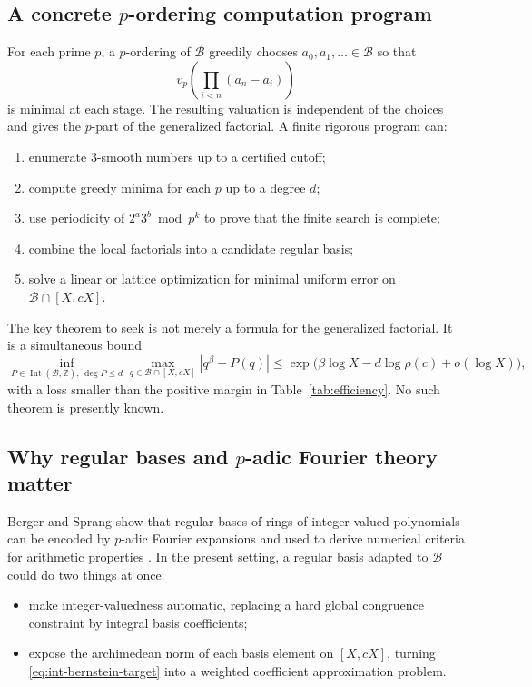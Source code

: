 \documentclass[11pt,oneside]{article}
\theoremstyle{definition}
\theoremstyle{remark}
\newcommand{\Z}{\mathbb Z}
\newcommand{\Bsem}{\mathcal B}
\newcommand{\Int}{\operatorname{Int}}
\begin{document}
\subsection{A concrete $p$-ordering computation program}

For each prime $p$, a $p$-ordering of $\Bsem$ greedily chooses
$a_0,a_1,\ldots\in\Bsem$ so that
\[
 v_p\!\left(\prod_{i<n}(a_n-a_i)\right)
\]
is minimal at each stage.  The resulting valuation is independent of the choices and gives
the $p$-part of the generalized factorial.  A finite rigorous program can:

\begin{enumerate}
\item enumerate $3$-smooth numbers up to a certified cutoff;
\item compute greedy minima for each $p$ up to a degree $d$;
\item use periodicity of $2^a3^b\bmod p^k$ to prove that the finite search is complete;
\item combine the local factorials into a candidate regular basis;
\item solve a linear or lattice optimization for minimal uniform error on
      $\Bsem\cap[X,cX]$.
\end{enumerate}

The key theorem to seek is not merely a formula for the generalized factorial.  It is a
simultaneous bound
\begin{equation}
 \inf_{P\in\Int(\Bsem,\Z),\,\deg P\le d}
 \max_{q\in\Bsem\cap[X,cX]}|q^\beta-P(q)|
 \le \exp\bigl(\beta\log X-d\log\rho(c)+o(\log X)\bigr),
 \label{eq:int-bernstein-target}
\end{equation}
with a loss smaller than the positive margin in Table~\ref{tab:efficiency}.  No such theorem
is presently known.

\subsection{Why regular bases and $p$-adic Fourier theory matter}

Berger and Sprang show that regular bases of rings of integer-valued polynomials can be
encoded by $p$-adic Fourier expansions and used to derive numerical criteria for arithmetic
properties \cite{BergerSprang2025}.  In the present setting, a regular basis adapted to
$\Bsem$ could do two things at once:

\begin{itemize}
\item make integer-valuedness automatic, replacing a hard global congruence constraint by
      integral basis coefficients;
\item expose the archimedean norm of each basis element on $[X,cX]$, turning
      \eqref{eq:int-bernstein-target} into a weighted coefficient approximation problem.
\end{itemize}
\end{document}
